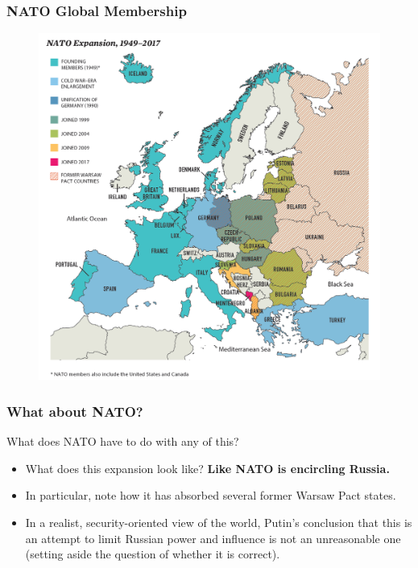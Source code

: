 \documentclass[handout]{beamer}
\begin{document}
\begin{frame} 
	\frametitle{\LARGE{NATO Global Membership}}
	\begin{figure}[ht!]
		\centering
		\includegraphics[width=\textwidth,height=\textheight, keepaspectratio]{nato.png}
	\end{figure}
\end{frame}

\begin{frame} 
	\frametitle{\LARGE{What about NATO?}}
	What does NATO have to do with any of this?
	\begin{itemize}
		\item What does this expansion look like? \pause \textbf{Like NATO is encircling Russia.} \pause
		\item In particular, note how it has absorbed several former Warsaw Pact states. \pause
		\item In a realist, security-oriented view of the world, Putin's conclusion that this is an attempt to limit Russian power and influence is not an unreasonable one (setting aside the question of whether it is correct).
	\end{itemize}
\end{frame}
\end{document}
